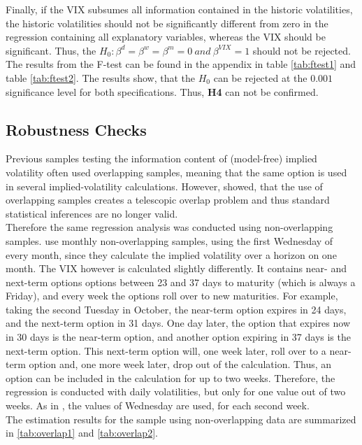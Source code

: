 Finally, if the VIX subsumes all information contained in the historic volatilities, the historic volatilities should not be significantly different from zero in the regression containing all explanatory variables, whereas the VIX should be significant. Thus, the $H_{0}: \beta^{d} = \beta^{w} = \beta^{m} = 0 \ and \ \beta^{VIX} = 1$ should not be rejected. The results from the F-test can be found in the appendix in table \ref{tab:ftest1} and table \ref{tab:ftest2}. The results show, that the $H_{0}$ can be rejected at the $0.001$ significance level for both specifications. Thus, \textbf{\ac{H4}} can not be confirmed.

%


\subsection{Robustness Checks}\label{sec51Robustness}

Previous samples testing the information content of (model-free) implied volatility often used overlapping samples, meaning that the same option is used in several implied-volatility calculations. However, \textcite{christensen1998} showed, that the use of overlapping samples creates a telescopic overlap problem and thus standard statistical inferences are no longer valid.\\
Therefore the same regression analysis was conducted using non-overlapping samples. \textcite{jiang2003} use monthly non-overlapping samples, using the first Wednesday of every month, since they calculate the implied volatility over a horizon on one month. The VIX however is calculated slightly differently. It contains near- and next-term options options between 23 and 37 days to maturity (which is always a Friday), and every week the options roll over to new maturities. For example, taking the second Tuesday in October, the near-term option expires in 24 days, and the next-term option in 31 days. One day later, the option that expires now in 30 days is the near-term option, and another option expiring in 37 days is the next-term option. This next-term option will, one week later, roll over to a near-term option and, one more week later, drop out of the calculation. Thus, an option can be included in the calculation for up to two weeks. Therefore, the regression is conducted with daily volatilities, but only for one value out of two weeks. As in \textcite{jiang2003}, the values of Wednesday are used, for each second week. \\
The estimation results for the sample using non-overlapping data are summarized in \ref{tab:overlap1} and \ref{tab:overlap2}.




\newpage
















